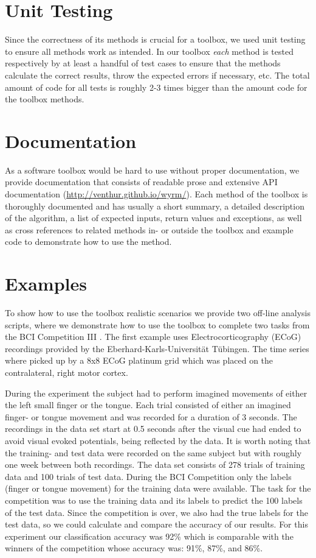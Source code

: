 \documentclass[letterpaper,compsoc,twoside]{IEEEtran}
\begin{document}
\section{Unit Testing\label{unit-testing}}


Since the correctness of its methods is crucial for a toolbox, we used unit
testing to ensure all methods work as intended. In our toolbox \emph{each} method is
tested respectively by at least a handful of test cases to ensure that the
methods calculate the correct results, throw the expected errors if necessary,
etc. The total amount of code for all tests is roughly 2-3 times bigger than the
amount code for the toolbox methods.

\section{Documentation\label{documentation}}


As a software toolbox would be hard to use without proper documentation, we
provide documentation that consists of readable prose and extensive API
documentation (\url{http://venthur.github.io/wyrm/}). Each method of the toolbox is
thoroughly documented and has usually a short summary, a detailed description of
the algorithm, a list of expected inputs, return values and exceptions, as well
as cross references to related methods in- or outside the toolbox and example
code to demonstrate how to use the method.

\section{Examples\label{examples}}


To show how to use the toolbox realistic scenarios we provide two off-line
analysis scripts, where we demonstrate how to use the toolbox to complete two
tasks from the BCI Competition III \cite{BCIComp3}. The first example uses
Electrocorticography (ECoG) recordings provided by the
Eberhard-Karls-Universität Tübingen. The time series where picked up by a 8x8
ECoG platinum grid which was placed on the contralateral, right motor cortex.

During the experiment the subject had to perform imagined movements of either
the left small finger or the tongue. Each trial consisted of either an imagined
finger- or tongue movement and was recorded for a duration of 3 seconds. The
recordings in the data set start at 0.5 seconds after the visual cue had ended
to avoid visual evoked potentials, being reflected by the data. It is worth
noting that the training- and test data were recorded on the same subject but
with roughly one week between both recordings. The data set consists of 278
trials of training data and 100 trials of test data. During the BCI Competition
only the labels (finger or tongue movement) for the training data were
available. The task for the competition was to use the training data and its
labels to predict the 100 labels of the test data. Since the competition is
over, we also had the true labels for the test data, so we could calculate and
compare the accuracy of our results. For this experiment our classification
accuracy was 92\% which is comparable with the winners of the competition whose
accuracy was: 91\%, 87\%, and 86\%.
\end{document}
